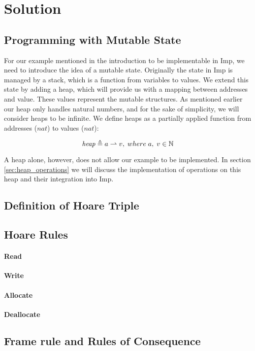 \section{Solution}
\subsection{Programming with Mutable State}
\label{sec:programming_with_mutable_state}
For our example mentioned in the introduction to be implementable in Imp, we need to introduce the idea of a mutable state. Originally the state in Imp is managed by a stack, which is a function from variables to values. We extend this state by adding a heap, which will provide us with a mapping between addresses and value. These values represent the mutable structures. As mentioned earlier our heap only handles natural numbers, and for the sake of simplicity, we will consider heaps to be infinite. We define heaps as a partially applied function from addresses ($nat$) to values ($nat$):

\[
\mathit{heap} \mathrel{\triangleq} a\rightharpoonup v, \; where\; a, \;v \in \mathbb{N}
\] 

A heap alone, however, does not allow our example to be implemented. In section \ref{sec:heap_operations} we will discuss the implementation of operations on this heap and their integration into Imp. 



\subsection{Definition of Hoare Triple}

\subsection{Hoare Rules}
\label{sec:hoare_rules}
\paragraph{Read}
\paragraph{Write}
\paragraph{Allocate}
\paragraph{Deallocate}
\subsection{Frame rule and Rules of Consequence}


